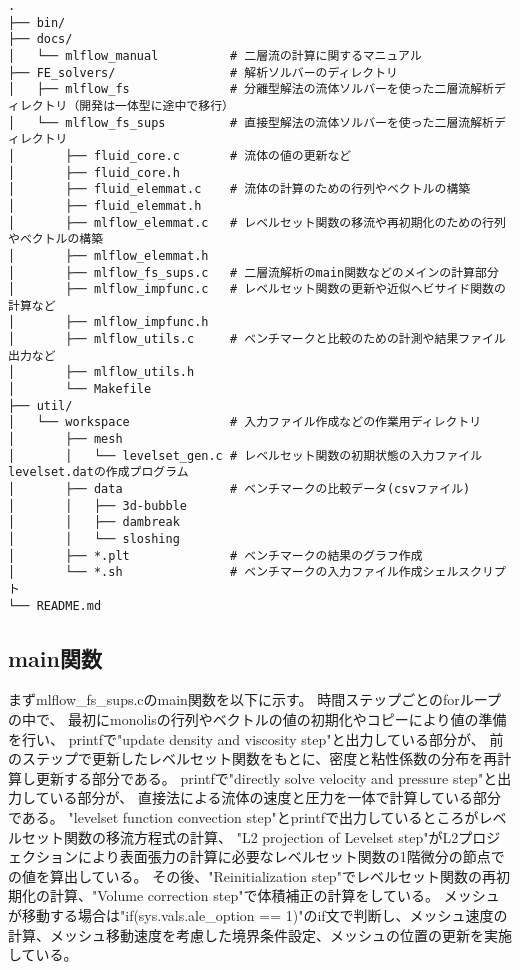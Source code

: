 \begin{verbatim}
.
├── bin/
├── docs/
│   └── mlflow_manual          # 二層流の計算に関するマニュアル
├── FE_solvers/                # 解析ソルバーのディレクトリ
│   ├── mlflow_fs              # 分離型解法の流体ソルバーを使った二層流解析ディレクトリ（開発は一体型に途中で移行）
│   └── mlflow_fs_sups         # 直接型解法の流体ソルバーを使った二層流解析ディレクトリ
│   	├── fluid_core.c       # 流体の値の更新など
│   	├── fluid_core.h
│   	├── fluid_elemmat.c    # 流体の計算のための行列やベクトルの構築
│   	├── fluid_elemmat.h
│   	├── mlflow_elemmat.c   # レベルセット関数の移流や再初期化のための行列やベクトルの構築
│   	├── mlflow_elemmat.h
│   	├── mlflow_fs_sups.c   # 二層流解析のmain関数などのメインの計算部分
│   	├── mlflow_impfunc.c   # レベルセット関数の更新や近似ヘビサイド関数の計算など
│   	├── mlflow_impfunc.h
│   	├── mlflow_utils.c     # ベンチマークと比較のための計測や結果ファイル出力など
│   	├── mlflow_utils.h
│   	└── Makefile
├── util/
│   └── workspace              # 入力ファイル作成などの作業用ディレクトリ
│   	├── mesh
│   	│   └── levelset_gen.c # レベルセット関数の初期状態の入力ファイルlevelset.datの作成プログラム
│   	├── data               # ベンチマークの比較データ(csvファイル)
│   	│   ├── 3d-bubble
│   	│   ├── dambreak
│   	│   └── sloshing
│   	├── *.plt              # ベンチマークの結果のグラフ作成
│   	└── *.sh               # ベンチマークの入力ファイル作成シェルスクリプト
└── README.md
\end{verbatim}

\subsection{main関数}

まずmlflow\_fs\_sups.cのmain関数を以下に示す。
時間ステップごとのforループの中で、
最初にmonolisの行列やベクトルの値の初期化やコピーにより値の準備を行い、
printfで"update density and viscosity step"と出力している部分が、
前のステップで更新したレベルセット関数をもとに、密度と粘性係数の分布を再計算し更新する部分である。
printfで"directly solve velocity and pressure step"と出力している部分が、
直接法による流体の速度と圧力を一体で計算している部分である。
"levelset function convection step"とprintfで出力しているところがレベルセット関数の移流方程式の計算、
"L2 projection of Levelset step"がL2プロジェクションにより表面張力の計算に必要なレベルセット関数の1階微分の節点での値を算出している。
その後、"Reinitialization step"でレベルセット関数の再初期化の計算、"Volume correction step"で体積補正の計算をしている。
メッシュが移動する場合は"if(sys.vals.ale\_option == 1)"のif文で判断し、メッシュ速度の計算、メッシュ移動速度を考慮した境界条件設定、メッシュの位置の更新を実施している。

